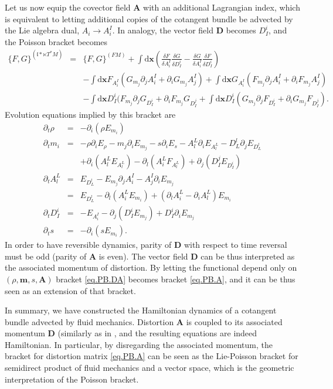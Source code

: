 \documentclass[
10pt, %
a4paper, %
oneside, %
headinclude,footinclude, %
BCOR5mm, %
]{scrartcl}
\newcommand{\xx}{\mathbf{x}}
\newcommand{\dx}{\mathrm{d}\xx}
\newcommand{\mm}{\mathbf{m}}
\renewcommand{\AA}{\mathbf{A}}
\newcommand{\DD}{\mathbf{D}}
\newcommand{\LA}{\mathfrak{l}}
\begin{document}
 Let us now equip the covector field $\AA$ with an additional Lagrangian index, which is equivalent to letting additional copies of the cotangent bundle be advected by the Lie algebra dual, $A_i \rightarrow A^I_i$. In analogy, the vector field $\DD$ becomes $D^i_I$, and the Poisson bracket becomes
 \begin{eqnarray}
	\{F,G\}^{(\LA*\ltimes T^*M)} &=& \{F,G\}^{(FM)} 
    + \int\dx \left(\frac{\delta F}{\delta A^I_i}\frac{\delta G}{\delta D^i_I}-\frac{\delta G}{\delta A^I_i}\frac{\delta F}{\delta D^i_I}\right)\\
	&&-\int\dx  F_{A^I_i} (G_{m_j} \partial_j A^I_i + \partial_i G_{m_j}A^I_j)
	+\int\dx  G_{A^I_i} (F_{m_j} \partial_j A^I_i + \partial_i F_{m_j}A^I_j)\nonumber\\
	&&- \int\dx D^i_I(F_{m_j} \partial_j G_{D^i_I} + \partial_i F_{m_j} G_{D^j_I}
   + \int\dx D^i_I(G_{m_j} \partial_j F_{D^i_I} + \partial_i G_{m_j} F_{D^j_I}).\nonumber
\end{eqnarray}
Evolution equations implied by this bracket are
\begin{subequations}\label{eq.PB.DA}
\begin{eqnarray}
	\partial_t \rho &=& -\partial_i(\rho E_{m_i})\\
	\partial_t m_i &=& -\rho\partial_i E_\rho - m_j \partial_i E_{m_j} -s \partial_i E_s - A^L_l\partial_i E_{A^L_l} -D^l_L \partial_j E_{D^l_L}\nonumber\\
		&&+\partial_i(A^L_l E_{A^L_l}) - \partial_l(A^L_i F_{A^L_l}) +\partial_j(D^j_I E_{D^i_I})\\
	\partial_t A^L_l &=& E_{D^l_L} -E_{m_j}\partial_j A^I_i -A^I_j \partial_i E_{m_j}\nonumber\\
	 &=& E_{D^l_L} -\partial_l (A^L_i E_{m_i}) + (\partial_l A^L_i - \partial_i A^L_l) E_{m_i}\\
	 \partial_t D^i_I &=& -E_{A^I_i} -\partial_j(D^i_I E_{m_j})+D^i_I\partial_i E_{m_j}\\
	\partial_t s &=& -\partial_i(s E_{m_i}).
\end{eqnarray}
\end{subequations}
In order to have reversible dynamics, parity of $\DD$ with respect to time reversal must be odd (parity of $\AA$ is even). The vector field $\DD$ can be thus interpreted as the associated momentum of distortion. By letting the functional depend only on $(\rho,\mm,s,\AA)$ bracket \eqref{eq.PB.DA} becomes bracket \eqref{eq.PB.A}, and it can be thus seen as an extension of that bracket.

In summary, we have constructed the Hamiltonian dynamics of a cotangent bundle advected by fluid mechanics. Distortion $\AA$ is coupled to its associated momentum $\DD$ (similarly as in \cite{Ilya-torsion}, and the resulting equations are indeed Hamiltonian. In particular, by disregarding the associated momentum, the bracket for distortion matrix \eqref{eq.PB.A} can be seen as the Lie-Poisson bracket for semidirect product of fluid mechanics and a vector space, which is the geometric interpretation of the Poisson bracket.
\end{document}
